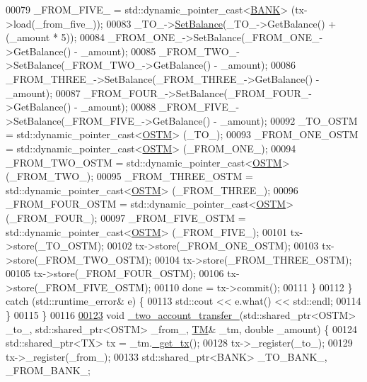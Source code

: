 \begin{DoxyCode}
00079             \_FROM\_FIVE\_ = std::dynamic\_pointer\_cast<\hyperlink{class_b_a_n_k}{BANK}> (tx->load(\_from\_five\_));
00083             \_TO\_->\hyperlink{class_b_a_n_k_ae3e45b407bf8ec7175662442ea24b7c0_ae3e45b407bf8ec7175662442ea24b7c0}{SetBalance}(\_TO\_->GetBalance() + (\_amount * 5));
00084             \_FROM\_ONE\_->SetBalance(\_FROM\_ONE\_->GetBalance() - \_amount);
00085             \_FROM\_TWO\_->SetBalance(\_FROM\_TWO\_->GetBalance() - \_amount);
00086             \_FROM\_THREE\_->SetBalance(\_FROM\_THREE\_->GetBalance() - \_amount);
00087             \_FROM\_FOUR\_->SetBalance(\_FROM\_FOUR\_->GetBalance() - \_amount);
00088             \_FROM\_FIVE\_->SetBalance(\_FROM\_FIVE\_->GetBalance() - \_amount);
00092             \_TO\_OSTM = std::dynamic\_pointer\_cast<\hyperlink{class_o_s_t_m}{OSTM}> (\_TO\_);
00093             \_FROM\_ONE\_OSTM = std::dynamic\_pointer\_cast<\hyperlink{class_o_s_t_m}{OSTM}> (\_FROM\_ONE\_);
00094             \_FROM\_TWO\_OSTM = std::dynamic\_pointer\_cast<\hyperlink{class_o_s_t_m}{OSTM}> (\_FROM\_TWO\_);
00095             \_FROM\_THREE\_OSTM = std::dynamic\_pointer\_cast<\hyperlink{class_o_s_t_m}{OSTM}> (\_FROM\_THREE\_);
00096             \_FROM\_FOUR\_OSTM = std::dynamic\_pointer\_cast<\hyperlink{class_o_s_t_m}{OSTM}> (\_FROM\_FOUR\_);
00097             \_FROM\_FIVE\_OSTM = std::dynamic\_pointer\_cast<\hyperlink{class_o_s_t_m}{OSTM}> (\_FROM\_FIVE\_);
00101             tx->store(\_TO\_OSTM);
00102             tx->store(\_FROM\_ONE\_OSTM);
00103             tx->store(\_FROM\_TWO\_OSTM);
00104             tx->store(\_FROM\_THREE\_OSTM);
00105             tx->store(\_FROM\_FOUR\_OSTM);
00106             tx->store(\_FROM\_FIVE\_OSTM);
00110             done = tx->commit();
00111         \}
00112     \} \textcolor{keywordflow}{catch} (std::runtime\_error& e) \{
00113         std::cout << e.what() << std::endl;
00114     \}
00115 \}
00116 
\hypertarget{main_8cpp_source.tex_l00123}{}\hyperlink{main_8cpp_a83aef8c5b69afef4e38d14c17fe782b3_a83aef8c5b69afef4e38d14c17fe782b3}{00123} \textcolor{keywordtype}{void} \hyperlink{main_8cpp_a83aef8c5b69afef4e38d14c17fe782b3_a83aef8c5b69afef4e38d14c17fe782b3}{\_two\_account\_transfer\_}(std::shared\_ptr<OSTM> \_to\_, std::shared\_ptr<OSTM> \_from\_,
       \hyperlink{class_t_m}{TM}& \_tm, \textcolor{keywordtype}{double} \_amount) \{
00124     std::shared\_ptr<TX> tx = \_tm.\hyperlink{class_t_m_a41cb0226cc4080c931651b13f74a0075_a41cb0226cc4080c931651b13f74a0075}{\_get\_tx}();
00128     tx->\_register(\_to\_);
00129     tx->\_register(\_from\_);
00133     std::shared\_ptr<BANK> \_TO\_BANK\_, \_FROM\_BANK\_;

\end{DoxyCode}
